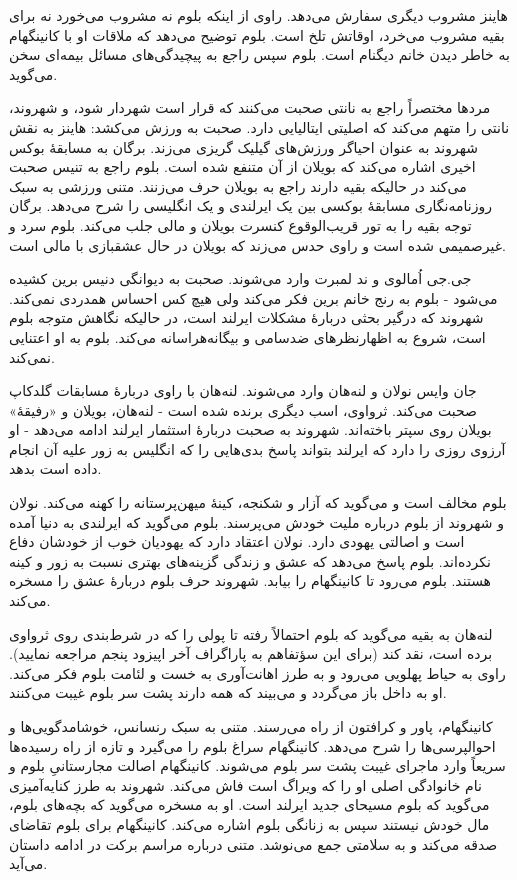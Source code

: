 \documentclass[12pt]{book}
\begin{document}
    هاینز مشروب دیگری سفارش می‌دهد. راوی از اینکه بلوم نه مشروب می‌خورد نه برای بقیه مشروب می‌خرد، اوقاتش تلخ است. بلوم توضیح می‌دهد که ملاقات او با کانینگهام به خاطر دیدن خانم دیگنام است. بلوم سپس راجع به پیچیدگی‌های مسائل بیمه‌ای سخن می‌گوید.

    مردها مختصراً راجع به نانتی صحبت می‌کنند که قرار است شهردار شود، و شهروند، نانتی را متهم می‌کند که اصلیتی ایتالیایی دارد. صحبت به ورزش می‌کشد: هاینز به نقش شهروند به عنوان احیاگر ورزش‌های گیلیک گریزی می‌زند. برگان به مسابقۀ بوکس اخیری اشاره می‌کند که بویلان از آن متنفع شده است. بلوم راجع به تنیس صحبت می‌کند در حالیکه بقیه دارند راجع به بویلان حرف می‌زنند. متنی ورزشی به سبک روزنامه‌نگاری مسابقۀ بوکسی بین یک ایرلندی و یک انگلیسی را شرح می‌دهد. برگان توجه بقیه را به تور قریب‌الوقوع کنسرت بویلان و مالی جلب می‌کند. بلوم سرد و غیرصمیمی شده است و راوی حدس می‌زند که بویلان در حال عشقبازی با مالی است.

    جی.جی اُمالوی و ند لمبرت وارد می‌شوند. صحبت به دیوانگی دنیس برین کشیده می‌شود - بلوم به رنج خانم برین فکر می‌کند ولی هیچ کس احساس همدردی نمی‌کند. شهروند که درگیر بحثی دربارۀ مشکلات ایرلند است، در حالیکه نگاهش متوجه بلوم است، شروع به اظهارنظرهای ضدسامی و بیگانه‌هراسانه می‌کند. بلوم به او اعتنایی نمی‌کند.

    جان وایس نولان و لنه‌هان وارد می‌شوند. لنه‌هان با راوی دربارۀ مسابقات گلدکاپ صحبت می‌کند. ثرواوی، اسب دیگری برنده شده است - لنه‌هان، بویلان و  «رفیقۀ» بویلان روی سپتر باخته‌اند. شهروند به صحبت دربارۀ استثمار ایرلند ادامه می‌دهد - او آرزوی روزی را دارد که ایرلند بتواند پاسخ بدی‌هایی را که انگلیس به زور علیه آن انجام داده است بدهد.

    بلوم مخالف است و می‌گوید که آزار و شکنجه، کینۀ میهن‌پرستانه را کهنه می‌کند. نولان و شهروند از بلوم درباره ملیت خودش می‌پرسند. بلوم می‌گوید که ایرلندی به دنیا آمده است و اصالتی یهودی دارد. نولان اعتقاد دارد که یهودیان خوب از خودشان دفاع نکرده‌اند. بلوم پاسخ می‌دهد که عشق و زندگی گزینه‌های بهتری نسبت به زور و کینه هستند. بلوم می‌رود تا کانینگهام را بیابد. شهروند حرف بلوم دربارۀ عشق را مسخره می‌کند.

    لنه‌هان به بقیه می‌گوید که بلوم احتمالاً رفته تا پولی را که در شرط‌بندی روی ثرواوی برده است، نقد کند (برای این سؤتفاهم به پاراگراف آخر اپیزود پنجم مراجعه نمایید). راوی به حیاط پهلویی می‌رود و به طرز اهانت‌آوری به خست و لئامت بلوم فکر می‌کند. او به داخل باز می‌گردد و می‌بیند که همه دارند پشت سر بلوم غیبت می‌کنند.

    کانینگهام، پاور و کرافتون از راه می‌رسند. متنی به سبک رنسانس، خوشامدگویی‌ها و احوالپرسی‌ها را شرح می‌دهد. کانینگهام سراغ بلوم را می‌گیرد و تازه از راه رسیده‌ها سریعاً وارد ماجرای غیبت پشت سر بلوم می‌شوند. کانینگهام اصالت مجارستانیِ بلوم و نام خانوادگی اصلی او را که ویراگ است فاش می‌کند. شهروند به طرز کنایه‌آمیزی می‌گوید که بلوم مسیحای جدید ایرلند است. او به مسخره می‌گوید که بچه‌های بلوم، مال خودش نیستند سپس به زنانگی بلوم اشاره می‌کند. کانینگهام برای بلوم تقاضای صدقه می‌کند و به سلامتی جمع می‌نوشد. متنی درباره مراسم برکت در ادامه داستان می‌آید.
\end{document}
